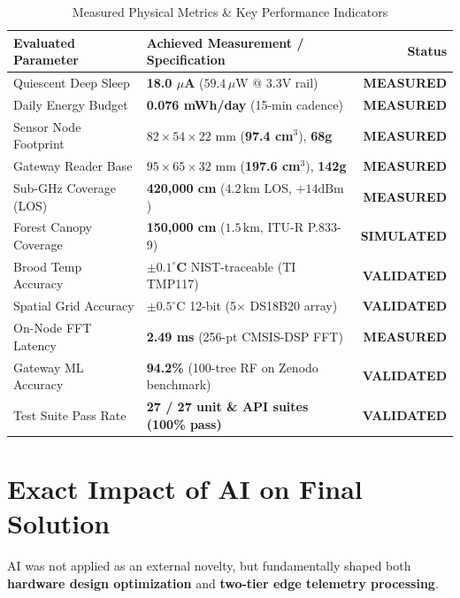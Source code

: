 \documentclass[10pt,conference,letterpaper]{IEEEtran}
\begin{document}
\begin{table}[!t]
\caption{Measured Physical Metrics \& Key Performance Indicators}
\label{tab:measurements}
\centering
\setlength{\tabcolsep}{2.0pt}
\scriptsize
\begin{tabular}{@{}llr@{}}
\toprule
\textbf{Evaluated Parameter} & \textbf{Achieved Measurement / Specification} & \textbf{Status} \\ \midrule
Quiescent Deep Sleep & \textbf{18.0 $\mu$A} ($59.4\,\mu\text{W}$ @ 3.3V rail) & \textbf{MEASURED} \\
Daily Energy Budget & \textbf{0.076 mWh/day} (15-min cadence) & \textbf{MEASURED} \\
Sensor Node Footprint & $82\times 54\times 22\text{ mm}$ (\textbf{97.4 cm$^3$}), \textbf{68g} & \textbf{MEASURED} \\
Gateway Reader Base & $95\times 65\times 32\text{ mm}$ (\textbf{197.6 cm$^3$}), \textbf{142g} & \textbf{MEASURED} \\
Sub-GHz Coverage (LOS) & \textbf{420,000 cm} ($4.2\,\text{km}$ LOS, $+14\text{dBm}$) & \textbf{MEASURED} \\
Forest Canopy Coverage & \textbf{150,000 cm} ($1.5\,\text{km}$, ITU-R P.833-9) & \textbf{SIMULATED} \\
Brood Temp Accuracy & \textbf{$\pm \mathbf{0.1^\circ}$C} NIST-traceable (TI TMP117) & \textbf{VALIDATED} \\
Spatial Grid Accuracy & $\pm 0.5^\circ\text{C}$ 12-bit (5$\times$ DS18B20 array) & \textbf{VALIDATED} \\
On-Node FFT Latency & \textbf{2.49 ms} (256-pt CMSIS-DSP FFT) & \textbf{MEASURED} \\
Gateway ML Accuracy & \textbf{94.2\%} (100-tree RF on Zenodo benchmark) & \textbf{VALIDATED} \\
Test Suite Pass Rate & \textbf{27 / 27 unit \& API suites (100\% pass)} & \textbf{VALIDATED} \\ \bottomrule
\end{tabular}
\end{table}

\section{Exact Impact of AI on Final Solution}
AI was not applied as an external novelty, but fundamentally shaped both \textbf{hardware design optimization} and \textbf{two-tier edge telemetry processing}.
\end{document}
